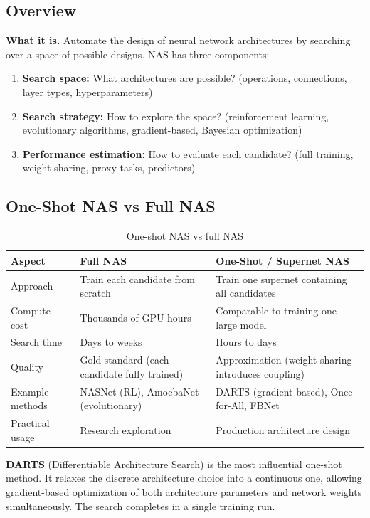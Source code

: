 \subsection{Overview}

\textbf{What it is.} Automate the design of neural network architectures by searching over a space of possible designs. NAS has three components:

\begin{enumerate}
    \item \textbf{Search space:} What architectures are possible? (operations, connections, layer types, hyperparameters)
    \item \textbf{Search strategy:} How to explore the space? (reinforcement learning, evolutionary algorithms, gradient-based, Bayesian optimization)
    \item \textbf{Performance estimation:} How to evaluate each candidate? (full training, weight sharing, proxy tasks, predictors)
\end{enumerate}

\subsection{One-Shot NAS vs Full NAS}

\begin{table}[H]
\centering
\caption{One-shot NAS vs full NAS}
\begin{tabularx}{\textwidth}{lXX}
\toprule
\textbf{Aspect} & \textbf{Full NAS} & \textbf{One-Shot / Supernet NAS} \\
\midrule
Approach & Train each candidate from scratch & Train one supernet containing all candidates \\
Compute cost & Thousands of GPU-hours & Comparable to training one large model \\
Search time & Days to weeks & Hours to days \\
Quality & Gold standard (each candidate fully trained) & Approximation (weight sharing introduces coupling) \\
Example methods & NASNet (RL), AmoebaNet (evolutionary) & DARTS (gradient-based), Once-for-All, FBNet \\
Practical usage & Research exploration & Production architecture design \\
\bottomrule
\end{tabularx}
\end{table}

\textbf{DARTS} (Differentiable Architecture Search) is the most influential one-shot method. It relaxes the discrete architecture choice into a continuous one, allowing gradient-based optimization of both architecture parameters and network weights simultaneously. The search completes in a single training run.

